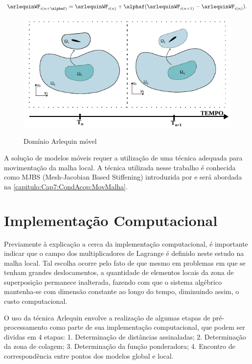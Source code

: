 \begin{align}
	\arlequinWF_{i(n+\alphaf)} = \arlequinWF_{i(n)} + \alphaf(\arlequinWF_{i(n+1)} - \arlequinWF_{i(n)}).
\end{align}

\begin{figure}[!htbp]
	\caption{Domínio Arlequin móvel}
	\centering 
	{\includegraphics[scale=1.5,trim=0cm 0cm 0cm 0cm, clip=true]{Imagens/Cap6/dominioArlequinMovel.pdf}}	
	\label{fig:dominioArlequinMovel}
\end{figure}

A solução de modelos móveis requer a utilização de uma técnica adequada para movimentação da malha local. A técnica utilizada nesse trabalho é conhecida como MJBS (Mesh-Jacobian Based Stiffening) introduzida por  e será abordada na  \autoref{capitulo:Cap7:CondAcop:MovMalha}.

\section{Implementação Computacional}

Previamente à explicação a cerca da implementação computacional, é importante indicar que o campo dos multiplicadores de Lagrange é definido neste estudo na malha local. Tal escolha ocorre pelo fato de que mesmo em problemas em que se tenham grandes deslocamentos, a quantidade de elementos locais da zona de superposição permanece inalterada, fazendo com que o sistema algébrico mantenha-se com dimensão constante ao longo do tempo, diminuindo assim, o custo computacional.

O uso da técnica Arlequin envolve a realização de algumas etapas de pré-processamento como parte de sua implementação computacional, que podem ser dividas em 4 etapas: 1. Determinação de distâncias assinaladas; 2. Determinação da zona de colagem;  3. Determinação da função ponderadora; 4. Encontro de correspondência entre pontos dos modelos global e local.


